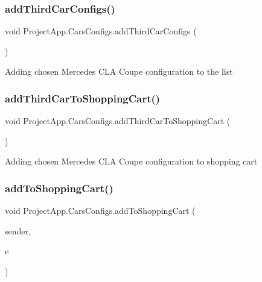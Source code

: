 \subsubsection{\texorpdfstring{add\+Third\+Car\+Configs()}{addThirdCarConfigs()}}
{\footnotesize\ttfamily void Project\+App.\+Cars\+Configs.\+add\+Third\+Car\+Configs (\begin{DoxyParamCaption}{ }\end{DoxyParamCaption})\hspace{0.3cm}{\ttfamily [private]}}



Adding chosen Mercedes C\+LA Coupe configuration to the list 

\mbox{\label{class_project_app_1_1_cars_configs_a7adb47c84724e950b614c1d74129af9f}} 
\subsubsection{\texorpdfstring{add\+Third\+Car\+To\+Shopping\+Cart()}{addThirdCarToShoppingCart()}}
{\footnotesize\ttfamily void Project\+App.\+Cars\+Configs.\+add\+Third\+Car\+To\+Shopping\+Cart (\begin{DoxyParamCaption}{ }\end{DoxyParamCaption})\hspace{0.3cm}{\ttfamily [private]}}



Adding chosen Mercedes C\+LA Coupe configuration to shopping cart 

\mbox{\label{class_project_app_1_1_cars_configs_a3f5a51e193603365f8b449d1681445aa}} 
\subsubsection{\texorpdfstring{add\+To\+Shopping\+Cart()}{addToShoppingCart()}}
{\footnotesize\ttfamily void Project\+App.\+Cars\+Configs.\+add\+To\+Shopping\+Cart (\begin{DoxyParamCaption}\item[{object}]{sender,  }\item[{Routed\+Event\+Args}]{e }\end{DoxyParamCaption})\hspace{0.3cm}{\ttfamily [private]}}



